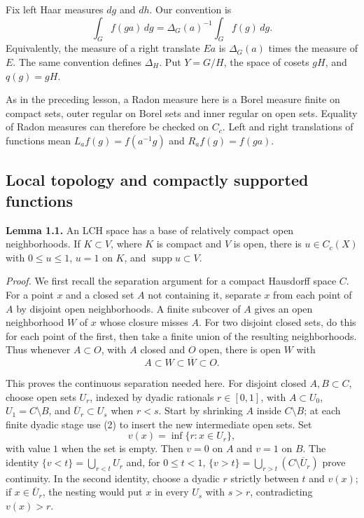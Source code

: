 \documentclass[
  english,
  11pt,
  a4paper,
]{article}
\begin{document}
Fix left Haar measures \(dg\) and \(dh\). Our convention is
\[\int_G f(ga)\,dg=\Delta_G(a)^{-1}\int_G f(g)\,dg.
\tag{1}\] Equivalently, the measure of a right translate \(Ea\) is
\(\Delta_G(a)\) times the measure of \(E\). The same convention defines
\(\Delta_H\). Put \(Y=G/H\), the space of cosets \(gH\), and
\(q(g)=gH\).

As in the preceding lesson, a Radon measure here is a Borel measure
finite on compact sets, outer regular on Borel sets and inner regular on
open sets. Equality of Radon measures can therefore be checked on
\(C_c\). Left and right translations of functions mean
\(L_af(g)=f(a^{-1}g)\) and \(R_af(g)=f(ga)\).

\subsection{Local topology and compactly supported
functions}\label{quotient-measures-and-weils-integration-formula--local-topology-and-compactly-supported-functions}

\textbf{Lemma 1.1.} An LCH space has a base of relatively compact open
neighborhoods. If \(K\subset V\), where \(K\) is compact and \(V\) is
open, there is \(u\in C_c(X)\) with \(0\leq u\leq1\), \(u=1\) on \(K\),
and \(\operatorname{supp}u\subset V\).

\emph{Proof.} We first recall the separation argument for a compact
Hausdorff space \(C\). For a point \(x\) and a closed set \(A\) not
containing it, separate \(x\) from each point of \(A\) by disjoint open
neighborhoods. A finite subcover of \(A\) gives an open neighborhood
\(W\) of \(x\) whose closure misses \(A\). For two disjoint closed sets,
do this for each point of the first, then take a finite union of the
resulting neighborhoods. Thus whenever \(A\subset O\), with \(A\) closed
and \(O\) open, there is open \(W\) with
\[A\subset W\subset\overline W\subset O.
\tag{2}\]

This proves the continuous separation needed here. For disjoint closed
\(A,B\subset C\), choose open sets \(U_r\), indexed by dyadic rationals
\(r\in[0,1]\), with \(A\subset U_0\), \(U_1=C\setminus B\), and
\(\overline U_r\subset U_s\) when \(r<s\). Start by shrinking \(A\)
inside \(C\setminus B\); at each finite dyadic stage use (2) to insert
the new intermediate open sets. Set \[v(x)=\inf\{r:x\in U_r\},\] with
value \(1\) when the set is empty. Then \(v=0\) on \(A\) and \(v=1\) on
\(B\). The identity \(\{v<t\}=\bigcup_{r<t}U_r\) and, for \(0\leq t<1\),
\(\{v>t\}=\bigcup_{r>t}(C\setminus\overline U_r)\) prove continuity. In
the second identity, choose a dyadic \(r\) strictly between \(t\) and
\(v(x)\); if \(x\in\overline U_r\), the nesting would put \(x\) in every
\(U_s\) with \(s>r\), contradicting \(v(x)>r\).
\end{document}
